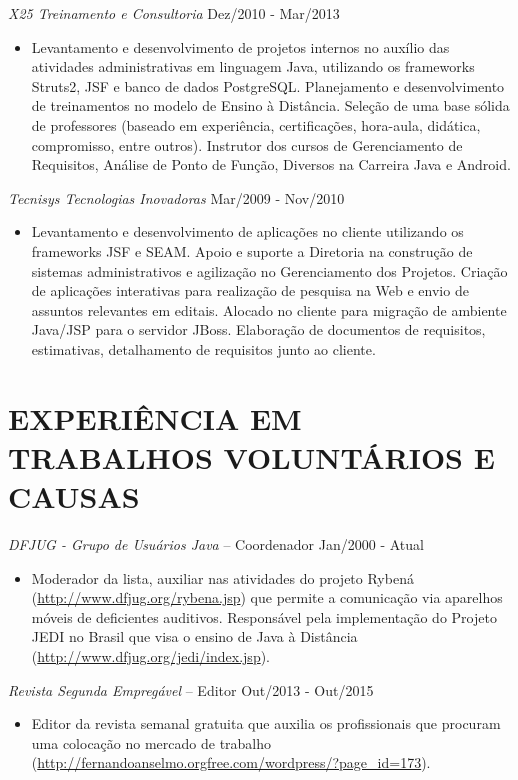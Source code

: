 \documentclass{res}
\begin{document}
\begin{resume}
{\sl X25 Treinamento e Consultoria} \hfill   Dez/2010 - Mar/2013
\begin{itemize}
  \item Levantamento e desenvolvimento de projetos internos no auxílio das atividades 
  administrativas em linguagem Java, utilizando os frameworks Struts2, JSF e banco de dados 
  PostgreSQL. Planejamento e desenvolvimento de treinamentos no modelo de Ensino à Distância. 
  Seleção de uma base sólida de professores (baseado em experiência, certificações, hora-aula, 
  didática, compromisso, entre outros). Instrutor dos cursos de Gerenciamento de Requisitos, 
  Análise de Ponto de Função, Diversos na Carreira Java e Android. 
\end{itemize}

{\sl Tecnisys Tecnologias Inovadoras} \hfill   Mar/2009 - Nov/2010
\begin{itemize}
  \item Levantamento e desenvolvimento de aplicações no cliente utilizando os frameworks 
  JSF e SEAM. Apoio e suporte a Diretoria na construção de sistemas administrativos e 
  agilização no Gerenciamento dos Projetos. Criação de aplicações interativas para realização 
  de pesquisa na Web e envio de assuntos relevantes em editais. Alocado no cliente para 
  migração de ambiente Java/JSP para o servidor JBoss. Elaboração de documentos de requisitos, 
  estimativas, detalhamento de requisitos junto ao cliente.
\end{itemize}

\section{EXPERIÊNCIA EM TRABALHOS VOLUNTÁRIOS E CAUSAS}
\vspace{8pt} 
{\sl DFJUG - Grupo de Usuários Java} -- Coordenador \hfill Jan/2000 - Atual
\begin{itemize}
	\item Moderador da lista, auxiliar nas atividades do projeto Rybená (\url{http://www.dfjug.org/rybena.jsp}) 
	que permite a comunicação via aparelhos móveis de deficientes auditivos. Responsável pela implementação 
	do Projeto JEDI no Brasil que visa o ensino de Java à Distância (\url{http://www.dfjug.org/jedi/index.jsp}).
\end{itemize}

{\sl Revista Segunda Empregável} -- Editor \hfill   Out/2013 - Out/2015
\begin{itemize}
	\item Editor da revista semanal gratuita que auxilia os profissionais 
	que procuram uma colocação no mercado de trabalho (\url{http://fernandoanselmo.orgfree.com/wordpress/?page_id=173}).
\end{itemize}


\end{resume}
\end{document}
